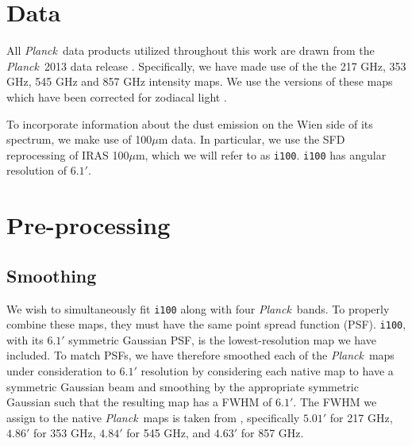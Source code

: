 \documentclass{emulateapj}
\newcommand{\PLANCK}{{\it Planck}}
\begin{document}

\section{Data}
\label{sec:data}
All \PLANCK~data products utilized throughout this work are drawn from the 
\PLANCK~2013 data release \citep{planck2013}. Specifically, we have made use 
of the the 217 GHz, 353 GHz, 545 GHz and 857 GHz intensity maps. We use the 
versions of these maps which have been corrected for zodiacal light 
\citep[\texttt{R1.10\_nominal\_ZodiCorrected},][]{planckzodi}.



To incorporate information about the dust emission on the Wien side of its 
spectrum, we make use of 100$\mu$m data. In particular, we use the SFD 
reprocessing of IRAS 100$\mu$m, which we will refer to as \verb|i100|. \verb|i100| has angular resolution of $6.1'$. %

\section{Pre-processing}
\label{sec:prepro}

\subsection{Smoothing}
We wish to simultaneously fit \verb|i100| along with four \PLANCK~bands. To 
properly combine these maps, they must have the same point spread function 
(PSF). \verb|i100|, with its $6.1'$ symmetric Gaussian PSF, is the 
lowest-resolution map we have included. To match PSFs, we have therefore 
smoothed each of the \PLANCK~maps under consideration to $6.1'$ resolution by 
considering each native map to have a symmetric Gaussian beam and smoothing by 
the appropriate symmetric Gaussian such that the resulting map has a FWHM of 
$6.1'$. The FWHM we assign to the native \PLANCK~maps is taken from 
\cite{planckbeam}, specifically $5.01'$ for 217 GHz, $4.86'$ for 353 GHz, 
$4.84'$ for 545 GHz, and $4.63'$ for 857 GHz.
\end{document}
